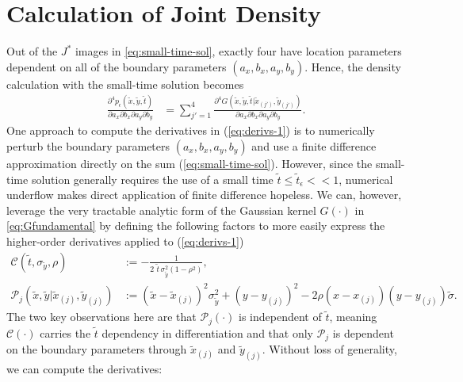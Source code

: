 \section{Calculation of Joint Density}
Out of the $J^*$ images in \eqref{eq:small-time-sol}, exactly four
have location parameters dependent on all of the boundary parameters
$(a_x, b_x, a_y, b_y)$. Hence, the density calculation with the
small-time solution becomes
\begin{align}
  \frac{\partial^4 p_\epsilon(\tilde{x}, \tilde{y}, \tilde{t})}{\partial a_x \partial b_x \partial a_y \partial b_y}  &= \sum_{j'=1}^{4}
                                                                                                                        \frac{\partial^4G(\tilde{x},\tilde{y},\tilde{t}|\tilde{x}_{(j')},\tilde{y}_{(j')})}{\partial a_x \partial b_x \partial a_y \partial b_y}. \label{eq:derivs-1}
\end{align}
One approach to compute the derivatives in (\ref{eq:derivs-1}) is to
numerically perturb the boundary parameters $(a_x,b_x,a_y,b_y)$ and
use a finite difference approximation directly on the sum
(\ref{eq:small-time-sol}). However, since the small-time solution
generally requires the use of a small time
$\tilde{t} \leq \tilde{t}_\epsilon << 1$, numerical underflow makes
direct application of finite difference hopeless.  We can, however,
leverage the very tractable analytic form of the Gaussian kernel
$G(\cdot)$ in \eqref{eq:Gfundamental} by defining the following
factors to more easily express the higher-order derivatives applied to
(\ref{eq:derivs-1})
\begin{align}
  \mathcal{C}(\tilde{t}, \sigma_{\tilde{y}}, \rho) &:= -\frac{1}{2\,\,\tilde{t}\, \sigma_{\tilde{y}}^2 (1-\rho^2)}, \\
  \mathcal{P}_j(\tilde{x},\tilde{y} | \tilde{x}_{(j)}, \tilde{y}_{(j)}) &:= \left(\tilde{x}- \tilde{x}_{(j)}\right)^2 \sigma_{\tilde{y}}^2 + \left(y-y_{(j)}\right)^2 - 2\rho(x-x_{(j)})(y-y_{(j)})\tilde{\sigma}.
\end{align}
The two key observations here are that $\mathcal{P}_j(\cdot)$ is
independent of $\tilde{t}$, meaning $\mathcal{C}(\cdot)$ carries the
$\tilde{t}$ dependency in differentiation and that only
$\mathcal{P}_j$ is dependent on the boundary parameters through
$\tilde{x}_{(j)}$ and $\tilde{y}_{(j)}$. Without loss of generality,
we can compute the derivatives:
